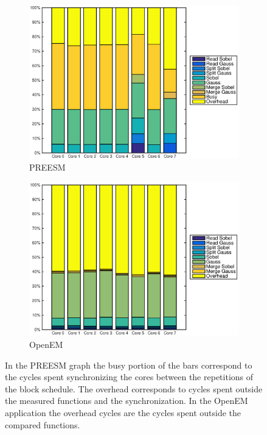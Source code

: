 \begin{figure}
    \centering
    \begin{subfigure}[t]{0.49\textwidth}
        \centering
        \includegraphics[width=0.99\linewidth]{images/preesm_cifcif.eps}
        \caption{PREESM}
        \label{fig:preesmcif}
    \end{subfigure}
    \begin{subfigure}[t]{0.49\textwidth}
        \centering
        \includegraphics[width=0.99\linewidth]{images/openem_cifcif_2initial_func.eps}
        \caption{OpenEM}
        \label{fig:oem8corefunc}
    \end{subfigure}
    \caption{In the PREESM graph the busy portion of the bars correspond to the cycles spent synchronizing the cores between the repetitions of the block schedule. The overhead corresponds to cycles spent outside the measured functions and the synchronization. In the OpenEM application the overhead cycles are the cycles spent outside the compared functions.}
\end{figure}

